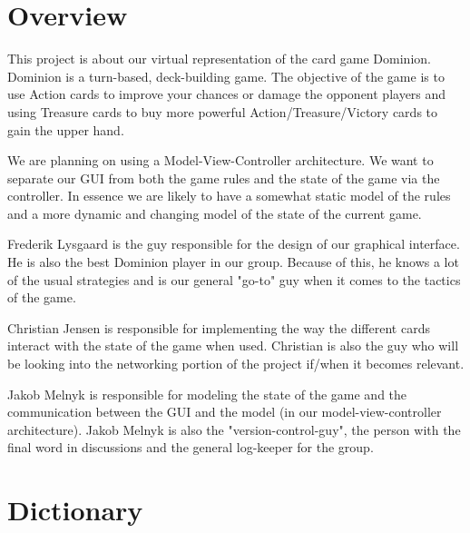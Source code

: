 \documentclass[12pt,a4paper,notitlepage]{article}
\begin{document}
\section{Overview}
This project is about our virtual representation of the card game Dominion. Dominion is a turn-based, deck-building game. The objective of the game is to use Action cards to improve your chances or damage the opponent players and using Treasure cards to buy more powerful Action/Treasure/Victory cards to gain the upper hand. 

We are planning on using a Model-View-Controller architecture. We want to separate our GUI from both the game rules and the state of the game via the controller. In essence we are likely to have a somewhat static model of the rules and a more dynamic and changing model of the state of the current game.

Frederik Lysgaard is the guy responsible for the design of our graphical interface. He is also the best Dominion player in our group. Because of this, he knows a lot of the usual strategies and is our general "go-to" guy when it comes to the tactics of the game.

Christian Jensen is responsible for implementing the way the different cards interact with the state of the game when used. Christian is also the guy who will be looking into the networking portion of the project if/when it becomes relevant.

Jakob Melnyk is responsible for modeling the state of the game and the communication between the GUI and the model (in our model-view-controller architecture). Jakob  Melnyk is also the "version-control-guy", the person with the final word in discussions and the general log-keeper for the group.
\section{Dictionary}
\end{document}
